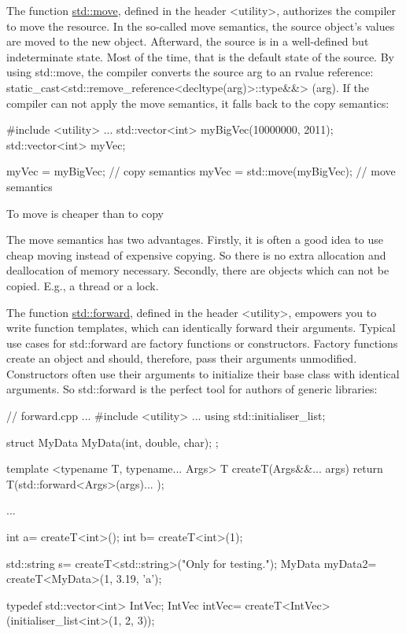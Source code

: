 The function \href{http://en.cppreference.com/w/cpp/utility/move}{std::move}, defined in the header <utility>, authorizes the compiler to move the resource. In the so-called move semantics, the source object’s values are moved to the new object. Afterward, the source is in a well-defined but indeterminate state. Most of the time, that is the default state of the source. By using std::move, the compiler converts the source arg to an rvalue reference: static\_cast<std::remove\_reference<decltype(arg)>::type\&\&> (arg). If the compiler can not apply the move semantics, it falls back to the copy semantics:

\begin{cpp}
#include <utility>
...
std::vector<int> myBigVec(10000000, 2011);
std::vector<int> myVec;

myVec = myBigVec; // copy semantics
myVec = std::move(myBigVec); // move semantics
\end{cpp}


\begin{myTip}{To move is cheaper than to copy}
	
The move semantics has two advantages. Firstly, it is often a good idea to use cheap moving instead of expensive copying. So there is no extra allocation and deallocation of memory necessary. Secondly, there are objects which can not be copied. E.g., a thread or a lock.

\end{myTip}


The function \href{http://en.cppreference.com/w/cpp/utility/forward}{std::forward}, defined in the header <utility>, empowers you to write function templates, which can identically forward their arguments. Typical use cases for std::forward are factory functions or constructors. Factory functions create an object and should, therefore, pass their arguments unmodified. Constructors often use their arguments to initialize their base class with identical arguments. So std::forward is the perfect tool for authors of generic libraries:


\begin{cpp}
// forward.cpp
...
#include <utility>
...
using std::initialiser_list;

struct MyData{
	MyData(int, double, char){};
};

template <typename T, typename... Args>
T createT(Args&&... args){
	return T(std::forward<Args>(args)... );
}

...

int a= createT<int>();
int b= createT<int>(1);

std::string s= createT<std::string>("Only for testing.");
MyData myData2= createT<MyData>(1, 3.19, 'a');

typedef std::vector<int> IntVec;
IntVec intVec= createT<IntVec>(initialiser_list<int>({1, 2, 3}));
\end{cpp}

